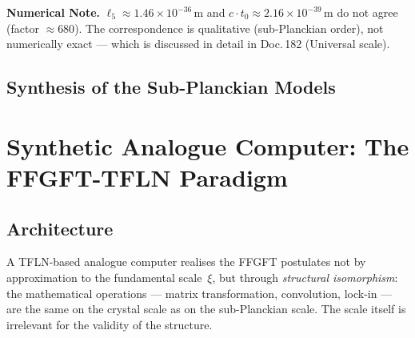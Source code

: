 \begin{warnbox}
\textbf{Numerical Note.}
$\ell_5 \approx 1.46 \times 10^{-36}\,\text{m}$ and
$c\cdot t_0 \approx 2.16 \times 10^{-39}\,\text{m}$
do not agree (factor $\approx 680$).
The correspondence is qualitative (sub-Planckian order), not numerically
exact — which is discussed in detail in Doc.\,182 (Universal scale).
\end{warnbox}

\subsection{Synthesis of the Sub-Planckian Models}

\begin{table}[H]
\centering
\caption{Comparison of sub-Planckian models}
\smallskip
{}
\end{table}

\section{Synthetic Analogue Computer: The FFGFT-TFLN Paradigm}

\subsection{Architecture}

A TFLN-based analogue computer realises the FFGFT postulates not by
approximation to the fundamental scale~$\xi$, but through \emph{structural
isomorphism}: the mathematical operations — matrix transformation,
convolution, lock-in — are the same on the crystal scale as on the
sub-Planckian scale. The scale itself is irrelevant for the validity
of the structure.

